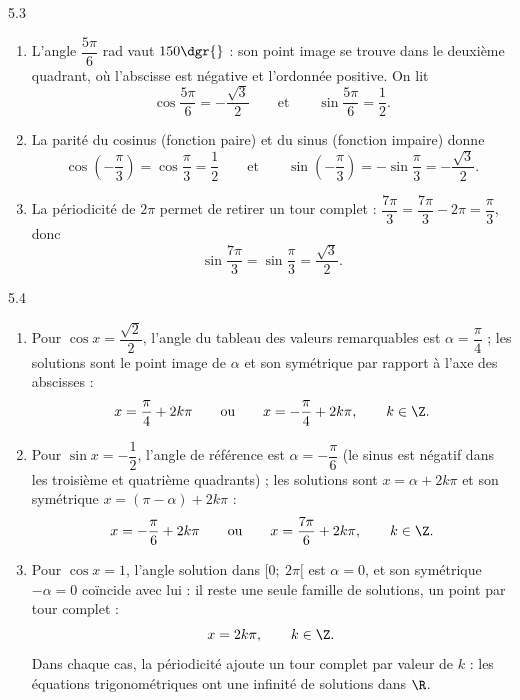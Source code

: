 \begin{corrige}{5.3}
\begin{enumerate}
\item L'angle $\dfrac{5\pi}{6}$ rad vaut $150\dgr{}$ : son point image se trouve dans le deuxième quadrant, où l'abscisse est négative et l'ordonnée positive. On lit
\[
\cos\frac{5\pi}{6} = -\frac{\sqrt{3}}{2}
\qquad\text{et}\qquad
\sin\frac{5\pi}{6} = \frac{1}{2} .
\]
\item La parité du cosinus (fonction paire) et du sinus (fonction impaire) donne
\[
\cos\left(-\frac{\pi}{3}\right) = \cos\frac{\pi}{3} = \frac{1}{2}
\qquad\text{et}\qquad
\sin\left(-\frac{\pi}{3}\right) = -\sin\frac{\pi}{3} = -\frac{\sqrt{3}}{2} .
\]
\item La périodicité de $2\pi$ permet de retirer un tour complet : $\dfrac{7\pi}{3} = \dfrac{7\pi}{3} - 2\pi = \dfrac{\pi}{3}$, donc
\[
\sin\frac{7\pi}{3} = \sin\frac{\pi}{3} = \frac{\sqrt{3}}{2} .
\]
\end{enumerate}
\end{corrige}

\begin{corrige}{5.4}
\begin{enumerate}
\item Pour $\cos x = \dfrac{\sqrt{2}}{2}$, l'angle du tableau des valeurs remarquables est $\alpha = \dfrac{\pi}{4}$ ; les solutions sont le point image de $\alpha$ et son symétrique par rapport à l'axe des abscisses :
\[
x = \frac{\pi}{4} + 2k\pi \qquad\text{ou}\qquad x = -\frac{\pi}{4} + 2k\pi, \qquad k \in \Z .
\]
\item Pour $\sin x = -\dfrac{1}{2}$, l'angle de référence est $\alpha = -\dfrac{\pi}{6}$ (le sinus est négatif dans les troisième et quatrième quadrants) ; les solutions sont $x = \alpha + 2k\pi$ et son symétrique $x = (\pi - \alpha) + 2k\pi$ :
\[
x = -\frac{\pi}{6} + 2k\pi \qquad\text{ou}\qquad x = \frac{7\pi}{6} + 2k\pi, \qquad k \in \Z .
\]
\item Pour $\cos x = 1$, l'angle solution dans $[0;\ 2\pi[$ est $\alpha = 0$, et son symétrique $-\alpha = 0$ coïncide avec lui : il reste une seule famille de solutions, un point par tour complet :
\[
x = 2k\pi, \qquad k \in \Z .
\]
Dans chaque cas, la périodicité ajoute un tour complet par valeur de $k$ : les équations trigonométriques ont une infinité de solutions dans $\R$.
\end{enumerate}
\end{corrige}
